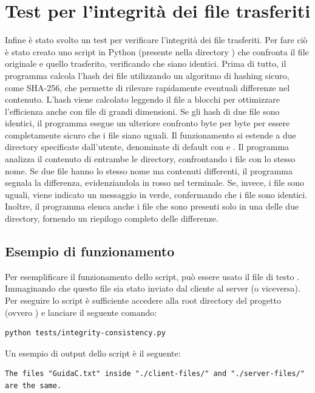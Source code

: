 \section{Test per l'integrità dei file trasferiti }
Infine è stato svolto un test per verificare l'integrità dei file trasferiti.
Per fare ciò è stato creato uno script in Python (presente nella directory ) che confronta il file originale e quello trasferito, verificando che siano identici.
Prima di tutto, il programma calcola l'hash dei file utilizzando un algoritmo di hashing sicuro, come SHA-256, che permette di rilevare rapidamente eventuali differenze nel contenuto.
L'hash viene calcolato leggendo il file a blocchi per ottimizzare l'efficienza anche con file di grandi dimensioni.
Se gli hash di due file sono identici, il programma esegue un ulteriore confronto byte per byte per essere completamente sicuro che i file siano uguali.
Il funzionamento si estende a due directory specificate dall'utente, denominate di default con  e .
Il programma analizza il contenuto di entrambe le directory, confrontando i file con lo stesso nome.
Se due file hanno lo stesso nome ma contenuti differenti, il programma segnala la differenza, evidenziandola in rosso nel terminale.
Se, invece, i file sono uguali, viene indicato un messaggio in verde, confermando che i file sono identici.
Inoltre, il programma elenca anche i file che sono presenti solo in una delle due directory, fornendo un riepilogo completo delle differenze.

\subsection{Esempio di funzionamento}
Per esemplificare il funzionamento dello script, può essere usato il file di testo .
Immaginando che questo file sia stato inviato dal cliente al server (o viceversa).
Per eseguire lo script è sufficiente accedere alla root directory del progetto (ovvero ) e lanciare il seguente comando:

\begin{lstlisting}[numbers=none]
python tests/integrity-consistency.py
\end{lstlisting}

Un esempio di output dello script è il seguente:

\begin{lstlisting}[numbers=none]
The files "GuidaC.txt" inside "./client-files/" and "./server-files/" are the same.
\end{lstlisting}
